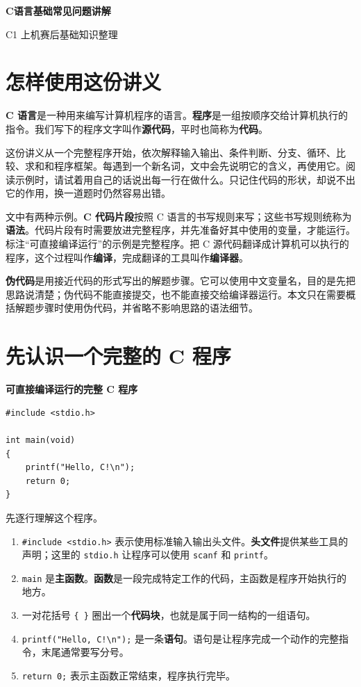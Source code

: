 \documentclass[UTF8,zihao=-4,fontset=windows]{ctexart}
\newcommand{\term}[1]{\textbf{\color{navy}#1}}
\newcommand{\clabel}{\noindent\textbf{可直接编译运行的完整 C 程序}\par\nopagebreak}
\begin{document}
\begin{center}
  {\bfseries\color{navy} C语言基础常见问题讲解\par}
  \vspace{0.6em}
  {\color{darkgray} C1 上机赛后基础知识整理\par}
\end{center}
\vspace{1.2em}

\section*{怎样使用这份讲义}

\term{C 语言}是一种用来编写计算机程序的语言。\term{程序}是一组按顺序交给计算机执行的指令。我们写下的程序文字叫作\term{源代码}，平时也简称为\term{代码}。

这份讲义从一个完整程序开始，依次解释输入输出、条件判断、分支、循环、比较、求和和程序框架。每遇到一个新名词，文中会先说明它的含义，再使用它。阅读示例时，请试着用自己的话说出每一行在做什么。只记住代码的形状，却说不出它的作用，换一道题时仍然容易出错。

文中有两种示例。\term{C 代码片段}按照 C 语言的书写规则来写；这些书写规则统称为\term{语法}。代码片段有时需要放进完整程序，并先准备好其中使用的变量，才能运行。标注“可直接编译运行”的示例是完整程序。把 C 源代码翻译成计算机可以执行的程序，这个过程叫作\term{编译}，完成翻译的工具叫作\term{编译器}。

\term{伪代码}是用接近代码的形式写出的解题步骤。它可以使用中文变量名，目的是先把思路说清楚；伪代码不能直接提交，也不能直接交给编译器运行。本文只在需要概括解题步骤时使用伪代码，并省略不影响思路的语法细节。

\section{先认识一个完整的 C 程序}

\clabel
\begin{lstlisting}[style=cstyle]
#include <stdio.h>

int main(void)
{
    printf("Hello, C!\n");
    return 0;
}
\end{lstlisting}

先逐行理解这个程序。
\begin{enumerate}
  \item \verb|#include <stdio.h>| 表示使用标准输入输出头文件。\term{头文件}提供某些工具的声明；这里的 \verb|stdio.h| 让程序可以使用 \verb|scanf| 和 \verb|printf|。
  \item \verb|main| 是\term{主函数}。\term{函数}是一段完成特定工作的代码，主函数是程序开始执行的地方。
  \item 一对花括号 \verb|{ }| 圈出一个\term{代码块}，也就是属于同一结构的一组语句。
  \item \verb|printf("Hello, C!\n");| 是一条\term{语句}。语句是让程序完成一个动作的完整指令，末尾通常要写分号。
  \item \verb|return 0;| 表示主函数正常结束，程序执行完毕。
\end{enumerate}
\end{document}
